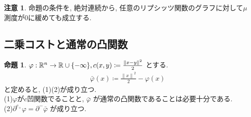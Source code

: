 \documentclass[10pt, fleqn, label-section=none, titlepage]{bxjsarticle}
\theoremstyle{definition}
\newtheorem{prop}[dfn]{命題}
\newtheorem{remark}[dfn]{注意}
\newcommand{\cbra}[1]{\mleft\{#1\mright\}}
\newcommand{\norm}[1]{\left\|#1\right\|}
\renewcommand{\;}{\, ; \,}
\begin{document}
\begin{remark}
命題の条件を, 絶対連続から, 任意のリプシッツ関数のグラフに対して$\mu$ 測度が$0$に緩めても成立する.
\end{remark}


\subsection{二乗コストと通常の凸関数}

\begin{prop}
$\varphi: \mathbb R^n \rightarrow \mathbb R \cup \cbra{-\infty} , c(x,y) \coloneqq \frac{\norm{x-y} ^2}{2}$ とする. 
\begin{align*} \bar \varphi (x) \coloneqq \frac{\norm x ^2}{2} - \varphi(x) \end{align*}
と定めると, (1)(2)が成り立つ.\\
(1)$\varphi$が$c$凹関数でることと, $\bar \varphi$ が通常の凸関数であることは必要十分である. \\
(2)$\partial ^{c_+} \varphi = \partial^- \bar \varphi$ が成り立つ.
\end{prop}
\end{document}
